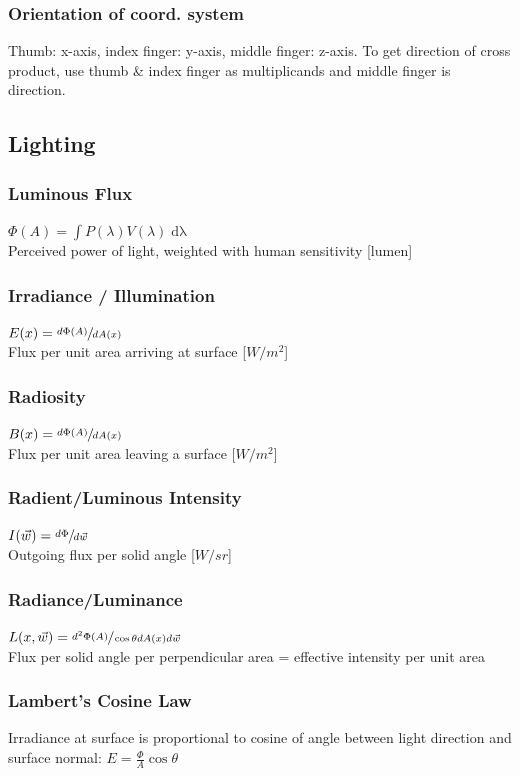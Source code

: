 \documentclass[a4paper,10pt]{article}
\begin{document}
\subsubsection{Orientation of coord. system}
Thumb: x-axis, index finger: y-axis, middle finger: z-axis. To get direction of cross product, use thumb \& index finger as multiplicands and middle finger is direction.

\subsection{Lighting}
\subsubsection{Luminous Flux} \( \Phi(A) = \int P(\lambda)V(\lambda) \mathop{d\lambda} \) \\
Perceived power of light, weighted with human sensitivity [lumen] 
\subsubsection{Irradiance / Illumination} \( E(x) = \sfrac{d \Phi(A)}{dA(x)} \) \\
Flux per unit area arriving at surface [\( \unit{W /m^2} \)]
\subsubsection{Radiosity} \( B(x) = \sfrac{d \Phi (A)}{dA(x)} \) \\
Flux per unit area leaving a surface [\( \unit{W/m^2} \)]
\subsubsection{Radient/Luminous Intensity} \( I(\vec{w}) = \sfrac{d \Phi}{d \vec{w}} \) \\
Outgoing flux per solid angle [\( \unit{W/sr} \)]
\subsubsection{Radiance/Luminance} \( L(x, \vec{w}) = \sfrac{d^2 \Phi (A)}{\cos \theta d A(x) d \vec{w}} \) \\
Flux per solid angle per perpendicular area = effective intensity per unit area
\subsubsection{Lambert's Cosine Law} Irradiance at surface is proportional to cosine of angle between light direction and surface normal: \( E = \frac{\Phi}{A} \cos \theta  \)
\end{document}
